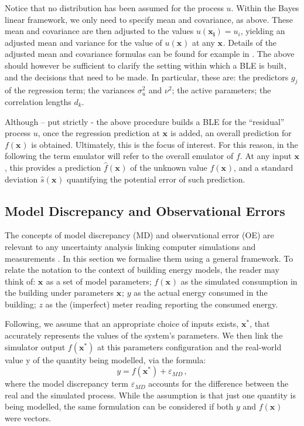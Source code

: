 \documentclass[preprint,12pt, sort&compress]{elsarticle}
\newcommand{\bd}[1]{\boldsymbol{#1}}
\newcommand{\x}[1][]{\bd{x_{#1}}}
\begin{document}
Notice that no distribution has been assumed for the process $u$. Within the Bayes linear framework, we only need to specify mean and covariance, as above. These mean and covariance are then adjusted to the values $u(\x[i])=u_i$, yielding an adjusted mean and variance for the value of $u(\x)$ at any $\x$. Details of the adjusted mean and covariance formulas can be found for example in \cite{goldstein2017, vernon2010galaxy, BLS2007}.
The above should however be sufficient to clarify the setting within which a BLE is built, and the decisions that need to be made. In particular, these are: the predictors $g_j$ of the regression term; the variances $\sigma_u^2$ and $\nu^2$; the active parameters; the correlation lengths $d_k$. 

Although – put strictly - the above procedure builds a BLE for the “residual” process $u$, once the regression prediction at $\x$ is added, an overall prediction for $f(\x)$ is obtained. Ultimately, this is the focus of interest. For this reason, in the following the term emulator will refer to the overall emulator of $f$. At any input $\x$, this provides a prediction $\hat{f}(\x)$ of the unknown value $f(\x)$, and a standard deviation $\hat{s}(\x)$ quantifying the potential error of such prediction.


\subsection{Model Discrepancy and Observational Errors}\label{Subsec_MD}
The concepts of model discrepancy (MD) and observational error (OE) are relevant to any uncertainty analysis linking computer simulations and measurements \cite{vernon2010galaxy, vernon2018gene, craig1997, domingo2020}.
In this section we formalise them using a general framework. To relate the notation to the context of building energy models, the reader may think of: $\x$ as a set of model parameters; $f(\x)$ as the simulated consumption in the building under parameters $\x$; $y$ as the actual energy consumed in the building; $z$ as the (imperfect) meter reading reporting the consumed energy. 

Following\cite{goldstein2017}, we assume that an appropriate choice of inputs exists, $\bd{x^*}$, that accurately represents the values of the system’s parameters. We then link the simulator output $f(\bd{x^*})$ at this parameters configuration and the real-world value y of the quantity being modelled, via the formula:
\begin{equation}\label{eqn_MD}
y = f(\bd{x^*}) + \varepsilon_{MD}\,,
\end{equation}
where the model discrepancy term $\varepsilon_{MD}$ accounts for the difference between the real and the simulated process. While the assumption is that just one quantity is being modelled, the same formulation can be considered if both $y$ and $f(\x)$ were vectors. 
\end{document}
